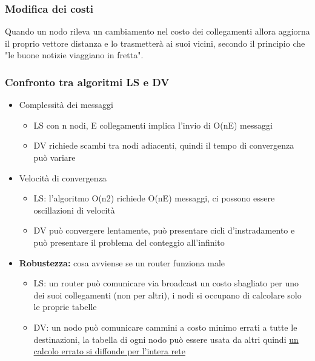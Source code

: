 \documentclass[
]{article}
\begin{document}
\hypertarget{header-n203}{%
\subsubsection{Modifica dei costi}\label{header-n203}}

Quando un nodo rileva un cambiamento nel costo dei collegamenti allora
aggiorna il proprio vettore distanza e lo trasmetterà ai suoi vicini,
secondo il principio che "le buone notizie viaggiano in fretta".

\hypertarget{header-n205}{%
\subsubsection{Confronto tra algoritmi LS e DV}\label{header-n205}}

\begin{itemize}
\item
  Complessità dei messaggi

  \begin{itemize}
  \item
    LS con n nodi, E collegamenti implica l'invio di O(nE) messaggi
  \item
    DV richiede scambi tra nodi adiacenti, quindi il tempo di
    convergenza può variare
  \end{itemize}
\item
  Velocità di convergenza

  \begin{itemize}
  \item
    LS: l'algoritmo O(n2) richiede O(nE) messaggi, ci possono essere
    oscillazioni di velocità
  \item
    DV può convergere lentamente, può presentare cicli d'instradamento e
    può presentare il problema del conteggio all'infinito
  \end{itemize}
\item
  \textbf{Robustezza:} cosa avviense se un router funziona male

  \begin{itemize}
  \item
    LS: un router può comunicare via broadcast un costo sbagliato per
    uno dei suoi collegamenti (non per altri), i nodi si occupano di
    calcolare solo le proprie tabelle
  \item
    DV: un nodo può comunicare cammini a costo minimo errati a tutte le
    destinazioni, la tabella di ogni nodo può essere usata da altri
    quindi \underline{un calcolo errato si diffonde per l'intera rete}
  \end{itemize}
\end{itemize}
\end{document}
